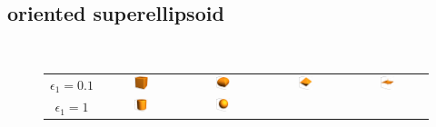 \subsection{oriented superellipsoid} ~\\

\begin{figure}[htb]
\begin{tabular}{ccccc}
  $\epsilon_1=0.1$
    & \includegraphics[width=0.2\textwidth]{../images/form_factor/supershapes/superquadric111_01_01.png}
    & \includegraphics[width=0.2\textwidth]{../images/form_factor/supershapes/superquadric111_01_1.png}
    & \includegraphics[width=0.2\textwidth]{../images/form_factor/supershapes/superquadric111_01_2.png}
    & \includegraphics[width=0.2\textwidth]{../images/form_factor/supershapes/superquadric111_01_5.png} \\
  $\epsilon_1=1$
    & \includegraphics[width=0.2\textwidth]{../images/form_factor/supershapes/superquadric111_1_01.png}
    & \includegraphics[width=0.2\textwidth]{../images/form_factor/supershapes/superquadric111_1_1.png}

\end{tabular}
\end{figure}
